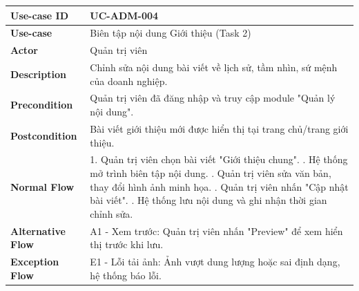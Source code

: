 \begin{table}[H]
\centering
\renewcommand{\arraystretch}{1.2}
\begin{tabular}{|p{3.5cm}|p{9.5cm}|}
\hline
\textbf{Use-case ID} & UC-ADM-004 \\ \hline
\textbf{Use-case} & Biên tập nội dung Giới thiệu (Task 2) \\ \hline
\textbf{Actor} & Quản trị viên \\ \hline
\textbf{Description} & Chỉnh sửa nội dung bài viết về lịch sử, tầm nhìn, sứ mệnh của doanh nghiệp. \\ \hline
\textbf{Precondition} & Quản trị viên đã đăng nhập và truy cập module "Quản lý nội dung". \\ \hline
\textbf{Postcondition} & Bài viết giới thiệu mới được hiển thị tại trang chủ/trang giới thiệu. \\ \hline
\textbf{Normal Flow} & 
1. Quản trị viên chọn bài viết "Giới thiệu chung". \newline
2. Hệ thống mở trình biên tập nội dung. \newline
3. Quản trị viên sửa văn bản, thay đổi hình ảnh minh họa. \newline
4. Quản trị viên nhấn "Cập nhật bài viết". \newline
5. Hệ thống lưu nội dung và ghi nhận thời gian chỉnh sửa. \\ \hline
\textbf{Alternative Flow} & A1 - Xem trước: Quản trị viên nhấn "Preview" để xem hiển thị trước khi lưu. \\ \hline
\textbf{Exception Flow} & E1 - Lỗi tải ảnh: Ảnh vượt dung lượng hoặc sai định dạng, hệ thống báo lỗi. \\ \hline
\end{tabular}
\end{table}

